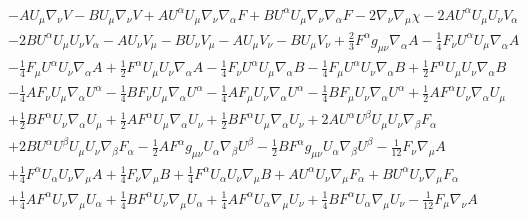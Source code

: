 \documentclass[10pt,letterpaper]{article}
\numberwithin{equation}{section}
\begin{document}
\begin{eqnarray}
&& -  A U_{\mu } \nabla_{\nu }V -  B U_{\mu } \nabla_{\nu }V + A U^{\alpha } U_{\mu } \nabla_{\nu }\nabla_{\alpha }F + B U^{\alpha } U_{\mu } \nabla_{\nu }\nabla_{\alpha }F - 2 \nabla_{\nu }\nabla_{\mu }\chi -2 A U^{\alpha } U_{\mu } U_{\nu } V_{\alpha } \nonumber \\ 
&& - 2 B U^{\alpha } U_{\mu } U_{\nu } V_{\alpha } -  A U_{\nu } V_{\mu } -  B U_{\nu } V_{\mu } -  A U_{\mu } V_{\nu } -  B U_{\mu } V_{\nu } + \tfrac{2}{3} F^{\alpha } g_{\mu \nu } \nabla_{\alpha }A -  \tfrac{1}{4} F_{\nu } U^{\alpha } U_{\mu } \nabla_{\alpha }A \nonumber \\ 
&& -  \tfrac{1}{4} F_{\mu } U^{\alpha } U_{\nu } \nabla_{\alpha }A + \tfrac{1}{2} F^{\alpha } U_{\mu } U_{\nu } \nabla_{\alpha }A -  \tfrac{1}{4} F_{\nu } U^{\alpha } U_{\mu } \nabla_{\alpha }B -  \tfrac{1}{4} F_{\mu } U^{\alpha } U_{\nu } \nabla_{\alpha }B + \tfrac{1}{2} F^{\alpha } U_{\mu } U_{\nu } \nabla_{\alpha }B \nonumber \\ 
&& -  \tfrac{1}{4} A F_{\nu } U_{\mu } \nabla_{\alpha }U^{\alpha } -  \tfrac{1}{4} B F_{\nu } U_{\mu } \nabla_{\alpha }U^{\alpha } -  \tfrac{1}{4} A F_{\mu } U_{\nu } \nabla_{\alpha }U^{\alpha } -  \tfrac{1}{4} B F_{\mu } U_{\nu } \nabla_{\alpha }U^{\alpha } + \tfrac{1}{2} A F^{\alpha } U_{\nu } \nabla_{\alpha }U_{\mu } \nonumber \\ 
&& + \tfrac{1}{2} B F^{\alpha } U_{\nu } \nabla_{\alpha }U_{\mu } + \tfrac{1}{2} A F^{\alpha } U_{\mu } \nabla_{\alpha }U_{\nu } + \tfrac{1}{2} B F^{\alpha } U_{\mu } \nabla_{\alpha }U_{\nu } + 2 A U^{\alpha } U^{\beta } U_{\mu } U_{\nu } \nabla_{\beta }F_{\alpha } \nonumber \\ 
&& + 2 B U^{\alpha } U^{\beta } U_{\mu } U_{\nu } \nabla_{\beta }F_{\alpha } -  \tfrac{1}{2} A F^{\alpha } g_{\mu \nu } U_{\alpha } \nabla_{\beta }U^{\beta } -  \tfrac{1}{2} B F^{\alpha } g_{\mu \nu } U_{\alpha } \nabla_{\beta }U^{\beta } -  \tfrac{1}{12} F_{\nu } \nabla_{\mu }A \nonumber \\ 
&& + \tfrac{1}{4} F^{\alpha } U_{\alpha } U_{\nu } \nabla_{\mu }A + \tfrac{1}{4} F_{\nu } \nabla_{\mu }B + \tfrac{1}{4} F^{\alpha } U_{\alpha } U_{\nu } \nabla_{\mu }B + A U^{\alpha } U_{\nu } \nabla_{\mu }F_{\alpha } + B U^{\alpha } U_{\nu } \nabla_{\mu }F_{\alpha } \nonumber \\ 
&& + \tfrac{1}{4} A F^{\alpha } U_{\nu } \nabla_{\mu }U_{\alpha } + \tfrac{1}{4} B F^{\alpha } U_{\nu } \nabla_{\mu }U_{\alpha } + \tfrac{1}{4} A F^{\alpha } U_{\alpha } \nabla_{\mu }U_{\nu } + \tfrac{1}{4} B F^{\alpha } U_{\alpha } \nabla_{\mu }U_{\nu } -  \tfrac{1}{12} F_{\mu } \nabla_{\nu }A \nonumber \\ 

\end{eqnarray}
\end{document}
